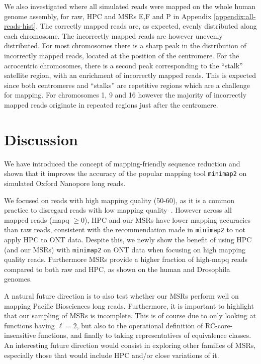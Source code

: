 \documentclass[
  11,
]{scrbook}
\begin{document}
We also investigated where all simulated reads were mapped on the whole
human genome assembly, for raw, HPC and MSRs E,F and P in
Appendix \ref{appendix:all-reads-hist}. The correctly mapped reads are, as
expected, evenly distributed along each chromosome. The incorrectly
mapped reads are however unevenly distributed. For most chromosomes
there is a sharp peak in the distribution of incorrectly mapped reads,
located at the position of the centromere. For the acrocentric
chromosomes, there is a second peak corresponding to the ``stalk''
satellite region, with an enrichment of incorrectly mapped reads. This
is expected since both centromeres and ``stalks'' are repetitive regions
which are a challenge for mapping. For chromosomes 1, 9 and 16 however
the majority of incorrectly mapped reads originate in repeated regions
just after the centromere.

\hypertarget{discussion}{%
\section{Discussion}\label{discussion}}

We have introduced the concept of mapping-friendly sequence reduction
and shown that it improves the accuracy of the popular mapping tool
\texttt{minimap2} on simulated Oxford Nanopore long reads.

We focused on reads with high mapping quality (50-60), as it is a common
practice to disregard reads with low mapping
quality~\autocite{prodanovSensitiveAlignmentUsing2020,liNewStrategiesImprove2021,liSyntheticdiploidBenchmarkAccurate2018}.
However across all mapped reads (mapq \(\geq 0\)), HPC and our MSRs have
lower mapping accuracies than raw reads, consistent with the
recommendation made in \texttt{minimap2} to not apply HPC to ONT data. Despite
this, we newly show the benefit of using HPC (and our MSRs) with
\texttt{minimap2} on ONT data when focusing on high mapping quality reads.
Furthermore MSRs provide a higher fraction of high-mapq reads compared
to both raw and HPC, as shown on the human and Drosophila genomes.

A natural future direction is to also test whether our MSRs perform well
on mapping Pacific Biosciences long reads. Furthermore, it is important
to highlight that our sampling of MSRs is incomplete. This is of course
due to only looking at functions having \(\ell=2\), but also to the
operational definition of RC-core-insensitive functions, and finally to
taking representatives of equivalence classes. An interesting future
direction would consist in exploring other families of MSRs, especially
those that would include HPC and/or close variations of it.
\end{document}

